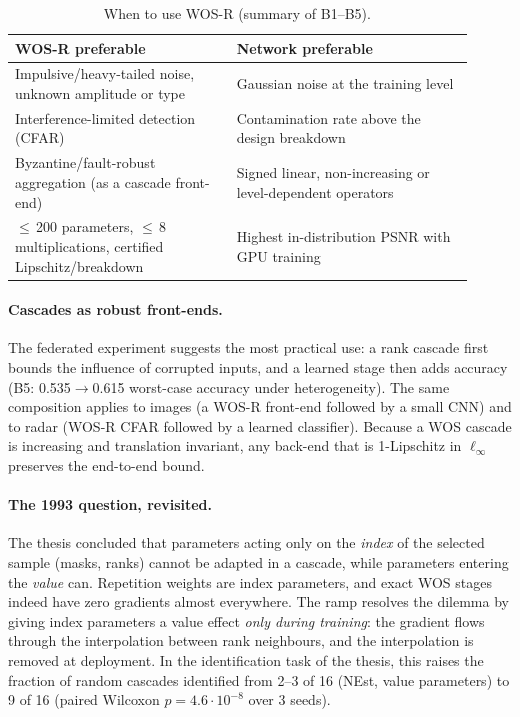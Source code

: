\documentclass[11pt,a4paper]{article}
\theoremstyle{definition}
\theoremstyle{remark}
\begin{document}
\begin{table}[t]\centering\small
\caption{When to use WOS-R (summary of B1--B5).}\label{tab:decision}
\begin{tabular}{p{0.44\linewidth}p{0.47\linewidth}}\toprule
WOS-R preferable & Network preferable\\\midrule
Impulsive/heavy-tailed noise, unknown amplitude or type & Gaussian noise at the training level\\
Interference-limited detection (CFAR) & Contamination rate above the design breakdown\\
Byzantine/fault-robust aggregation (as a cascade front-end) & Signed linear, non-increasing or level-dependent operators\\
$\le$\,200 parameters, $\le$\,8 multiplications, certified Lipschitz/breakdown & Highest in-distribution PSNR with GPU training\\
\bottomrule\end{tabular}\end{table}

\paragraph{Cascades as robust front-ends.} The federated experiment suggests the most practical use: a rank cascade
first bounds the influence of corrupted inputs, and a learned stage then adds accuracy (B5: 0.535$\to$0.615 worst-case
accuracy under heterogeneity). The same composition applies to images (a WOS-R front-end followed by a small CNN) and to
radar (WOS-R CFAR followed by a learned classifier). Because a WOS cascade is increasing and translation invariant,
any back-end that is 1-Lipschitz in $\ell_\infty$ preserves the end-to-end bound.

\paragraph{The 1993 question, revisited.} The thesis \cite{delrio1993} concluded that parameters acting only on the
\emph{index} of the selected sample (masks, ranks) cannot be adapted in a cascade, while parameters entering the
\emph{value} can. Repetition weights are index parameters, and exact WOS stages indeed have zero gradients almost
everywhere. The ramp resolves the dilemma by giving index parameters a value effect \emph{only during training}: the
gradient flows through the interpolation between rank neighbours, and the interpolation is removed at deployment. In
the identification task of the thesis, this raises the fraction of random cascades identified from 2--3 of 16 (NEst,
value parameters) to 9 of 16 (paired Wilcoxon $p=4.6\cdot10^{-8}$ over 3 seeds).
\end{document}
